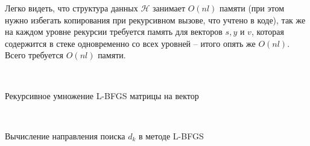 \documentclass[11pt]{article}
\begin{document}
Легко видеть, что структура данных $\mathcal{H}$ занимает $O(nl)$ памяти (при этом нужно избегать копирования при рекурсивном вызове, что учтено в коде), так же на каждом уровне рекурсии требуется память для векторов $s, y$ и $v$, которая содержится в стеке одновременно со всех уровней -- итого опять же $O(nl)$. Всего требуется $O(nl)$ памяти.

\

\begin{algorithm}[H]
	\SetAlgoLined
  	
\caption{Рекурсивное умножение L-BFGS матрицы на вектор}

\label{alg:mult}
\end{algorithm}

\

\begin{algorithm}[H]
	\SetAlgoLined
  	
\caption{Вычисление направления поиска $d_k$ в методе L-BFGS}
\label{alg:direction}
\end{algorithm}

\
\end{document}
